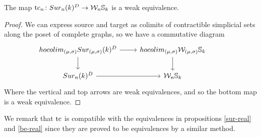 \begin{corollary} \label{cor-comparing}
	The map $\operatorname{tc}_{n} \colon Sur_{n}(k)^{D}\rightarrow \mathcal{W}_{n}\mathbb{S}_{k}$ is a weak equivalence.
\end{corollary}

\begin{proof}
	We can express source and target as colimits of contractible %
	simplicial sets along the poset of complete graphs,
	so we have a commutative diagram
	\begin{equation*}
		\begin{tikzcd}
			hocolim_{(\mu,\sigma)}\sur_{(\mu,\sigma)}(k)^{D} \arrow[r] \arrow[d]& hocolim_{(\mu,\sigma)}\cW_{(\mu,\sigma)}\sym_{k} \arrow[d] \\
			\sur_{n}(k)^{D}\arrow[r] & \cW_{n}\sym_{k}&
		\end{tikzcd}
	\end{equation*}
	Where the vertical and top arrows
	are weak equivalences, and so the bottom map is a weak equivalence.
\end{proof}

We remark that $\operatorname{tc}$ is compatible with the equivalences in propositions \ref{sur-real} and \ref{be-real} since they are proved to be equivalences by a similar method.





